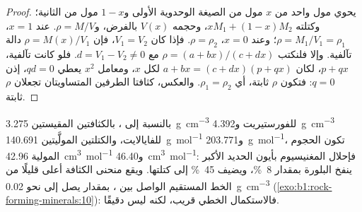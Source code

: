 \begin{proof}
يحوي مول واحد من  $x$ مول من الصيغة الوحدوية الأولى و$1 - x$ مول من الثانية؛ وكتلته $x M_1 + (1 - x) M_2$، وحجمه $V(x)$ بالفرض، و$\rho = M/V$. عند $x = 1$، $\rho = M_1/V_1 = \rho_1$؛ وعند $x = 0$، $\rho = \rho_2$. فإذا كان $V_1 = V_2$، فإن $\rho = M(x)/V_1$ دالة تآلفية. وإلا فلنكتب $\rho = (a + bx)/(c + dx)$ مع $d = V_1 - V_2 \ne 0$. فلو كانت تآلفية، $p + qx$، لكان $a + bx = (c + dx)(p + qx)$ لكل $x$، ومعامل $x^2$ يعطي $qd = 0$، إذن $q = 0$: فتكون $\rho$ ثابتة، أي $\rho_1 = \rho_2$. والعكس، كثافتا الطرفين المتساويتان تجعلان $\rho$ ثابتة.
\end{proof}

بالنسبة إلى ، بالكثافتين المقيستين \qty{3.275}{g.cm^{-3}} للفورستيريت و\qty{4.392}{g.cm^{-3}} للفايالايت، والكتلتين المولَّيتين \qty{140.691}{g.mol^{-1}} و\qty{203.771}{g.mol^{-1}}، تكون الحجوم المولية \qty{42.96}{cm^3.mol^{-1}} و\qty{46.40}{cm^3.mol^{-1}}: فإحلال المغنيسيوم بأيون الحديد الأكبر ينفخ البلورة بمقدار \qty{8}{\percent}، ويضيف \qty{45}{\percent} إلى كتلتها. ويقع منحنى الكثافة أعلى قليلًا من الخط المستقيم الواصل بين ، بمقدار يصل إلى نحو \qty{0.02}{g.cm^{-3}} (\cref{exo:b1:rock-forming-minerals:10}): فالاستكمال الخطي قريب، لكنه ليس دقيقًا.

